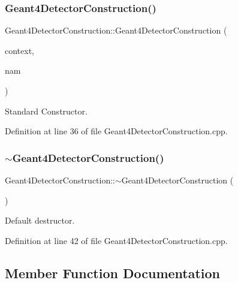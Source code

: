 \subsubsection{\texorpdfstring{Geant4\+Detector\+Construction()}{Geant4DetectorConstruction()}}
{\footnotesize\ttfamily Geant4\+Detector\+Construction\+::\+Geant4\+Detector\+Construction (\begin{DoxyParamCaption}\item[{\hyperlink{class_d_d4hep_1_1_simulation_1_1_geant4_context}{Geant4\+Context} $\ast$}]{context,  }\item[{const std\+::string \&}]{nam }\end{DoxyParamCaption})}



Standard Constructor. 



Definition at line 36 of file Geant4\+Detector\+Construction.\+cpp.

\hypertarget{class_d_d4hep_1_1_simulation_1_1_geant4_detector_construction_a78fcc174794d8ef64b402c1c296c43db}{}\label{class_d_d4hep_1_1_simulation_1_1_geant4_detector_construction_a78fcc174794d8ef64b402c1c296c43db} 
\subsubsection{\texorpdfstring{$\sim$\+Geant4\+Detector\+Construction()}{~Geant4DetectorConstruction()}}
{\footnotesize\ttfamily Geant4\+Detector\+Construction\+::$\sim$\+Geant4\+Detector\+Construction (\begin{DoxyParamCaption}{ }\end{DoxyParamCaption})\hspace{0.3cm}{\ttfamily [virtual]}}



Default destructor. 



Definition at line 42 of file Geant4\+Detector\+Construction.\+cpp.



\subsection{Member Function Documentation}
\hypertarget{class_d_d4hep_1_1_simulation_1_1_geant4_detector_construction_af7b296f1aa62b4d836c6275108953208}{}\label{class_d_d4hep_1_1_simulation_1_1_geant4_detector_construction_af7b296f1aa62b4d836c6275108953208} 
